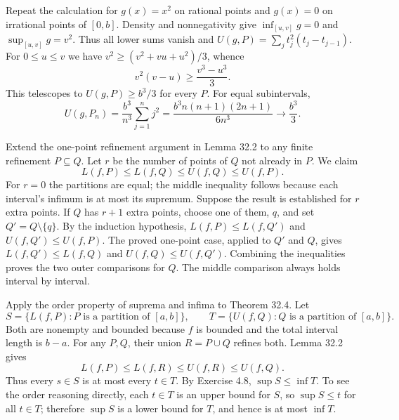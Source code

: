 \goal Repeat the calculation for $g(x)=x^2$ on rational points and
$g(x)=0$ on irrational points of $[0,b]$.
Density and nonnegativity give $\inf_{[u,v]}g=0$ and
$\sup_{[u,v]}g=v^2$. Thus all lower sums vanish and
$U(g,P)=\sum_j t_j^2(t_j-t_{j-1})$.
For $0\le u\le v$ we have $v^2\ge(v^2+vu+u^2)/3$, whence
\[
 v^2(v-u)\ge\frac{v^3-u^3}{3}.
\]
This telescopes to $U(g,P)\ge b^3/3$ for every $P$.
For equal subintervals,
\[
 U(g,P_n)=\frac{b^3}{n^3}\sum_{j=1}^n j^2
 =\frac{b^3n(n+1)(2n+1)}{6n^3}\longrightarrow\frac{b^3}{3}.
\]

\goal Extend the one-point refinement argument in Lemma 32.2 to any
finite refinement $P\subseteq Q$.
Let $r$ be the number of points of $Q$ not already in $P$.
We claim
\[
 L(f,P)\le L(f,Q)\le U(f,Q)\le U(f,P).
\]
For $r=0$ the partitions are equal; the middle inequality follows
because each interval's infimum is at most its supremum.
Suppose the result is established for $r$ extra points. If $Q$ has
$r+1$ extra points, choose one of them, $q$, and set $Q'=Q\setminus\{q\}$.
By the induction hypothesis,
$L(f,P)\le L(f,Q')$ and $U(f,Q')\le U(f,P)$.
The proved one-point case, applied to $Q'$ and $Q$, gives
$L(f,Q')\le L(f,Q)$ and $U(f,Q)\le U(f,Q')$.
Combining the inequalities proves the two outer comparisons for $Q$.
The middle comparison always holds interval by interval.

\goal Apply the order property of suprema and infima to Theorem 32.4.
Let
\[
 S=\{L(f,P):P\text{ is a partition of }[a,b]\},\qquad
 T=\{U(f,Q):Q\text{ is a partition of }[a,b]\}.
\]
Both are nonempty and bounded because $f$ is bounded and the total
interval length is $b-a$.
For any $P,Q$, their union $R=P\cup Q$ refines both. Lemma 32.2 gives
\[
 L(f,P)\le L(f,R)\le U(f,R)\le U(f,Q).
\]
Thus every $s\in S$ is at most every $t\in T$. By Exercise 4.8,
$\sup S\le\inf T$. To see the order reasoning directly, each $t\in T$
is an upper bound for $S$, so $\sup S\le t$ for all $t\in T$;
therefore $\sup S$ is a lower bound for $T$, and hence is at most
$\inf T$.

